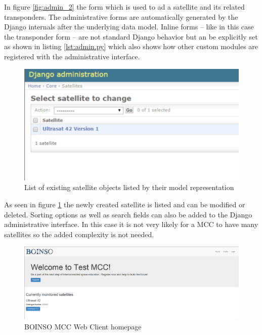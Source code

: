 \documentclass[BachelorPaper]{subfiles}
\begin{document}
In figure \ref{fig:admin_2} the form which is used to ad a satellite and its related transponders. The administrative forms are automatically generated by the Django internals after the underlying data model. Inline forms -- like in this case the transponder form -- are not standard Django behavior but an be explicitly set as shown in listing \ref{lst:admin.py} which also shows how other custom modules are registered with the administrative interface. \\



\begin{figure}[!htbp]
\centering
\includegraphics[width=0.96\linewidth]{PICs/BacPics/results/admin_3.png}
\caption{List of existing satellite objects listed by their model representation}\label{fig:admin_3}
\end{figure}

As seen in figure \ref{fig:admin_3} the newly created satellite is listed and can be modified or deleted. Sorting options as well as search fields can also be added to the Django administrative interface. In this case it is not very likely for a \ac{MCC} to have many satellites so the added complexity is not needed. \\

\begin{figure}[!htbp]
\centering
\includegraphics[width=0.96\linewidth]{PICs/BacPics/results/mcc_webapp_1.png}
\caption{BOINSO MCC Web Client homepage}\label{fig:mcc_web_1}
\end{figure}
\end{document}

